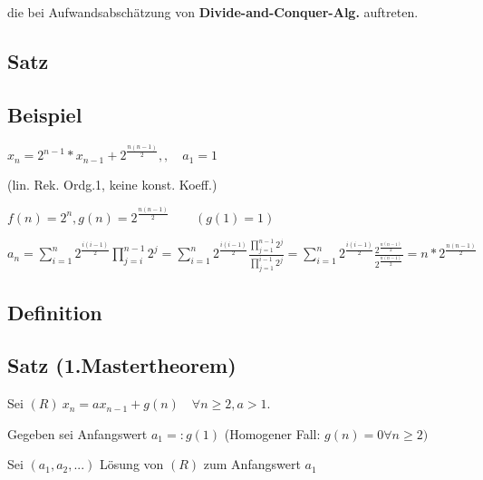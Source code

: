 die bei Aufwandsabschätzung von \textbf{Divide-and-Conquer-Alg.} auftreten.

\subsection{Satz} %

\subsection{Beispiel}%

$x_n = 2^{n-1}*x_{n-1}+2^{\frac{n(n-1)}{2}},, \quad a_1 =1$

(lin. Rek. Ordg.1, keine konst. Koeff.)

$f(n)=2^n, g(n) = 2^{\frac{n(n-1)}{2}} \qquad (g(1)=1)$

$a_n = \sum_{i=1}^{n} 2^{\frac{i(i-1)}{2}} \prod_{j=i}^{n-1}2^j = \sum_{i=1}^{n}2^\frac{i(i-1)}{2}\frac{\prod_{j=1}^{n-1}2^j}{\prod_{j=1}^{i-1}2^j} = \sum_{i=1}^{n}2^{\frac{i(i-1)}{2}} \frac{2^{\frac{n(n-1)}{2}}}{2^{\frac{n(n-1)}{2}}}= n*2^{\frac{n(n-1)}{2}}$

\subsection{Definition } %

\subsection{Satz (1.Mastertheorem)}

Sei $(R) ~ x_n = ax_{n-1}+g(n) \quad \forall n \geq 2, a>1$.

Gegeben sei Anfangswert $a_1 =: g(1)$ (Homogener Fall: $ g(n) = 0 \forall n \geq 2)$

Sei $(a_1,a_2,...)$ Lösung von $(R)$ zum Anfangswert $a_1$


